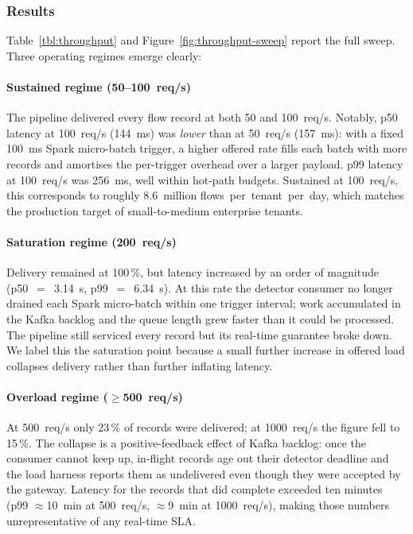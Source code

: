 
\subsubsection{Results}
\label{sec:throughput-results}

Table~\ref{tbl:throughput} and Figure~\ref{fig:throughput-sweep}
report the full sweep. Three operating regimes emerge clearly:

\paragraph{Sustained regime (50--100~req/s)} The pipeline delivered
every flow record at both 50 and 100~req/s. Notably, p50 latency at
100~req/s (144~ms) was \emph{lower} than at 50~req/s (157~ms): with a
fixed 100~ms Spark micro-batch trigger, a higher offered rate fills
each batch with more records and amortises the per-trigger overhead
over a larger payload. p99 latency at 100~req/s was 256~ms, well
within hot-path budgets. Sustained at 100~req/s, this corresponds
to roughly $8.6$~million flows~per~tenant~per~day, which matches the
production target of small-to-medium enterprise tenants.

\paragraph{Saturation regime (200~req/s)} Delivery remained at
100\,\%, but latency increased by an order of magnitude
(p50~$=$~3.14~s, p99~$=$~6.34~s). At this rate the detector consumer
no longer drained each Spark micro-batch within one trigger interval;
work accumulated in the Kafka backlog and the queue length grew
faster than it could be processed. The pipeline still serviced every
record but its real-time guarantee broke down. We label this the
saturation point because a small further increase in offered load
collapses delivery rather than further inflating latency.

\paragraph{Overload regime ($\geq$500~req/s)} At 500~req/s only
23\,\% of records were delivered; at 1000~req/s the figure fell to
15\,\%. The collapse is a positive-feedback effect of Kafka backlog:
once the consumer cannot keep up, in-flight records age out their
detector deadline and the load harness reports them as undelivered
even though they were accepted by the gateway. Latency for the
records that did complete exceeded ten minutes (p99
$\approx$10~min at 500~req/s, $\approx$9~min at 1000~req/s), making
those numbers unrepresentative of any real-time SLA.

